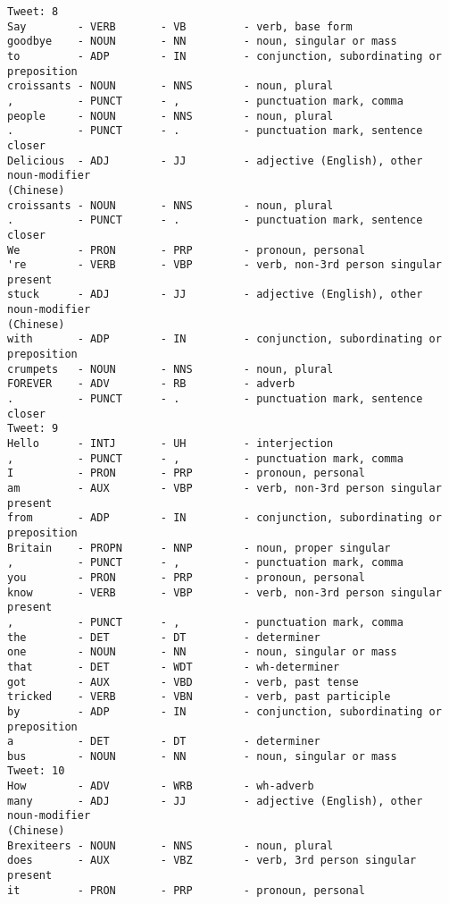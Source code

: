 \begin{Verbatim}[commandchars=\\\{\}]
Tweet: 8
Say        - VERB       - VB         - verb, base form
goodbye    - NOUN       - NN         - noun, singular or mass
to         - ADP        - IN         - conjunction, subordinating or preposition
croissants - NOUN       - NNS        - noun, plural
,          - PUNCT      - ,          - punctuation mark, comma
people     - NOUN       - NNS        - noun, plural
.          - PUNCT      - .          - punctuation mark, sentence closer
Delicious  - ADJ        - JJ         - adjective (English), other noun-modifier
(Chinese)
croissants - NOUN       - NNS        - noun, plural
.          - PUNCT      - .          - punctuation mark, sentence closer
We         - PRON       - PRP        - pronoun, personal
're        - VERB       - VBP        - verb, non-3rd person singular present
stuck      - ADJ        - JJ         - adjective (English), other noun-modifier
(Chinese)
with       - ADP        - IN         - conjunction, subordinating or preposition
crumpets   - NOUN       - NNS        - noun, plural
FOREVER    - ADV        - RB         - adverb
.          - PUNCT      - .          - punctuation mark, sentence closer
Tweet: 9
Hello      - INTJ       - UH         - interjection
,          - PUNCT      - ,          - punctuation mark, comma
I          - PRON       - PRP        - pronoun, personal
am         - AUX        - VBP        - verb, non-3rd person singular present
from       - ADP        - IN         - conjunction, subordinating or preposition
Britain    - PROPN      - NNP        - noun, proper singular
,          - PUNCT      - ,          - punctuation mark, comma
you        - PRON       - PRP        - pronoun, personal
know       - VERB       - VBP        - verb, non-3rd person singular present
,          - PUNCT      - ,          - punctuation mark, comma
the        - DET        - DT         - determiner
one        - NOUN       - NN         - noun, singular or mass
that       - DET        - WDT        - wh-determiner
got        - AUX        - VBD        - verb, past tense
tricked    - VERB       - VBN        - verb, past participle
by         - ADP        - IN         - conjunction, subordinating or preposition
a          - DET        - DT         - determiner
bus        - NOUN       - NN         - noun, singular or mass
Tweet: 10
How        - ADV        - WRB        - wh-adverb
many       - ADJ        - JJ         - adjective (English), other noun-modifier
(Chinese)
Brexiteers - NOUN       - NNS        - noun, plural
does       - AUX        - VBZ        - verb, 3rd person singular present
it         - PRON       - PRP        - pronoun, personal

\end{Verbatim}
